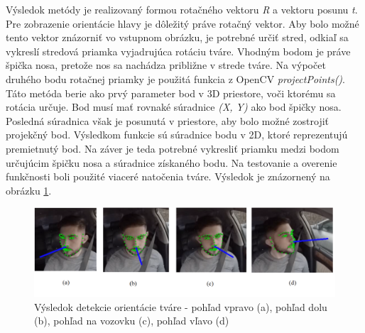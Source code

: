 \documentclass[slovak,master,dept460,male,cpp,cpdeclaration]{diploma}
\begin{document}
Výsledok metódy je realizovaný formou rotačného vektoru \textit{R} a vektoru posunu \textit{t}. Pre zobrazenie orientácie hlavy je dôležitý práve rotačný vektor. Aby  bolo možné tento vektor znázorniť vo vstupnom obrázku, je potrebné určiť stred, odkiaľ sa vykreslí stredová priamka vyjadrujúca rotáciu tváre. Vhodným bodom je práve špička nosa, pretože nos sa nachádza približne v strede tváre. Na výpočet druhého bodu rotačnej priamky je použitá funkcia z OpenCV \textit{projectPoints()}. Táto metóda berie ako prvý parameter bod v 3D priestore, voči ktorému sa rotácia určuje. Bod musí mať rovnaké súradnice \textit{(X, Y)} ako bod špičky nosa. Posledná súradnica však je posunutá v priestore, aby bolo možné zostrojiť projekčný bod. Výsledkom funkcie sú súradnice bodu v 2D, ktoré reprezentujú premietnutý bod. Na záver je teda potrebné vykresliť priamku medzi bodom určujúcim špičku nosa a súradnice získaného bodu. Na testovanie a overenie funkčnosti boli použité viaceré natočenia tváre. Výsledok je znázornený na obrázku \ref{fig:faceRotation}.


\begin{figure}[H]
	\centering
	\includegraphics[width=1\textwidth]{Figures/faceRotation.png}
	\caption{Výsledok detekcie orientácie tváre - pohľad vpravo (a), pohľad dolu (b), pohľad na vozovku (c), pohľad vľavo (d)}
	\label{fig:faceRotation}
\end{figure}
\end{document}

